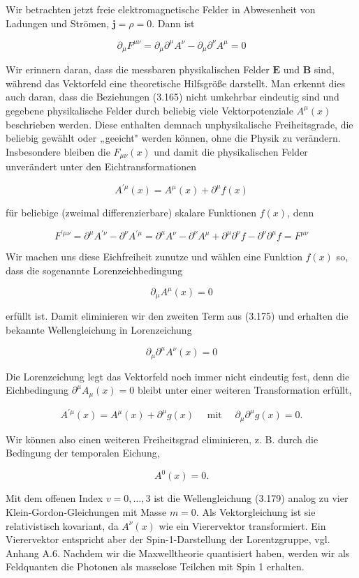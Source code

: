 \documentclass[10pt, letterpaper]{article}
\begin{document}
Wir betrachten jetzt freie elektromagnetische Felder in Abwesenheit von Ladungen und Strömen, $\mathbf{j}=\rho=0$. Dann ist

$$
\partial_{\mu} F^{\mu \nu}=\partial_{\mu} \partial^{\mu} A^{\nu}-\partial_{\mu} \partial^{\nu} A^{\mu}=0
$$

Wir erinnern daran, dass die messbaren physikalischen Felder $\mathbf{E}$ und $\mathbf{B}$ sind, während das Vektorfeld eine theoretische Hilfsgröße darstellt. Man erkennt dies auch daran, dass die Beziehungen (3.165) nicht umkehrbar eindeutig sind und gegebene physikalische Felder durch beliebig viele Vektorpotenziale $A^{\mu}(x)$ beschrieben werden. Diese enthalten demnach unphysikalische Freiheitsgrade, die beliebig gewählt oder „geeicht" werden können, ohne die Physik zu verändern. Insbesondere bleiben die $F_{\mu \nu}(x)$ und damit die physikalischen Felder unverändert unter den Eichtransformationen

$$
A^{\prime \mu}(x)=A^{\mu}(x)+\partial^{\mu} f(x)
$$

für beliebige (zweimal differenzierbare) skalare Funktionen $f(x)$, denn

$$
F^{\prime \mu \nu}=\partial^{\mu} A^{\prime \nu}-\partial^{\nu} A^{\prime \mu}=\partial^{\mu} A^{\nu}-\partial^{\nu} A^{\mu}+\partial^{\mu} \partial^{\nu} f-\partial^{\nu} \partial^{\mu} f=F^{\mu \nu}
$$

Wir machen uns diese Eichfreiheit zunutze und wählen eine Funktion $f(x)$ so, dass die sogenannte Lorenzeichbedingung

$$
\partial_{\mu} A^{\mu}(x)=0
$$

erfüllt ist. Damit eliminieren wir den zweiten Term aus (3.175) und erhalten die bekannte Wellengleichung in Lorenzeichung

$$
\partial_{\mu} \partial^{\mu} A^{\nu}(x)=0
$$

Die Lorenzeichung legt das Vektorfeld noch immer nicht eindeutig fest, denn die Eichbedingung $\partial^{\mu} A_{\mu}(x)=0$ bleibt unter einer weiteren Transformation erfüllt,

$$
A^{\prime \mu}(x)=A^{\mu}(x)+\partial^{\mu} g(x) \quad \text { mit } \quad \partial_{\mu} \partial^{\mu} g(x)=0 .
$$

Wir können also einen weiteren Freiheitsgrad eliminieren, z. B. durch die Bedingung der temporalen Eichung,

$$
A^{0}(x)=0 .
$$

Mit dem offenen Index $v=0, \ldots, 3$ ist die Wellengleichung (3.179) analog zu vier Klein-Gordon-Gleichungen mit Masse $m=0$. Als Vektorgleichung ist sie relativistisch kovariant, da $A^{\nu}(x)$ wie ein Vierervektor transformiert. Ein Vierervektor entspricht aber der Spin-1-Darstellung der Lorentzgruppe, vgl. Anhang A.6. Nachdem wir die Maxwelltheorie quantisiert haben, werden wir als Feldquanten die Photonen als masselose Teilchen mit Spin 1 erhalten.
\end{document}
